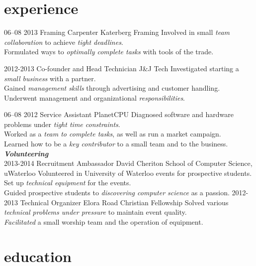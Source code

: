 \documentclass[]{friggeri-cv}
\newcommand{\imp}[1] {{\em #1}}
\begin{document}
\section{experience}
\begin{entrylist}

  \entry
    {06–08 2013}
    {Framing Carpenter}
    {Katerberg Framing}
    {Involved in small \imp{team collaboration} to achieve \imp{tight deadlines}. \\
    Formulated ways to \imp{optimally complete tasks}   with tools of the trade.
   }

  \entry
  	{2012-2013}
  	{Co-founder and Head Technician}
  	{J\&J Tech}
  	{Investigated starting a \imp{small business} with a partner. \\
	Gained \imp{management skills} through advertising and customer handling. \\
	Underwent management and organizational \imp{responsibilities}.}
	
  \entry
    {06–08 2012}
    {Service Assistant}
    {PlanetCPU}
    {Diagnosed software and hardware problems under \imp{tight time constraints}. \\
    Worked as a \imp{team to complete tasks}, as well as run a market campaign. \\
    Learned how to be a \imp{key contributor} to a small team and to the business.}
\textbf{\emph{Volunteering}} \\
  \entry
  	{2013-2014}
  	{Recruitment Ambassador}
  	{David Cheriton School of Computer Science, uWaterloo}
	{Volunteered in University of Waterloo events for prospective students. \\
  	Set up \imp{technical equipment}  for the events. \\
	Guided prospective students to \imp{discovering computer science} as a passion.}
  \entry
  	{2012-2013}
  	{Technical Organizer}
  	{Elora Road Christian Fellowship}
	{Solved various \imp{technical problems under pressure} to maintain event quality. \\
	\imp{Facilitated} a small worship team and the operation of equipment.}
  	

\end{entrylist}

\section{education}
\end{document}
